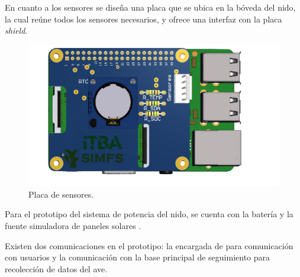 En cuanto a los sensores se diseña una placa que se ubica en la bóveda del nido, la cual reúne todos los sensores necesarios, y ofrece una interfaz con la placa \textit{shield}.
\begin{figure}[H]
	\centering
	\includegraphics[width=0.9\linewidth,page=2]{ImagenesConstruccion del prototipo/shieldSensor}		
	\caption{Placa de sensores.}
	\label{fig:sens}
\end{figure}

Para el prototipo del sistema de potencia del nido, se cuenta con la batería \TBC y la fuente simuladora de paneles solares \TBC.

Existen dos comunicaciones en el prototipo: la encargada de \nodered para comunicación con usuarios y la comunicación con la base principal de seguimiento para recolección de datos del ave.
